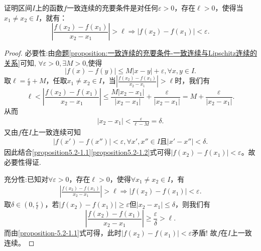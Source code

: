 \documentclass[../../main.tex]{subfiles}%
\begin{document}
\begin{proposition}\label{proposition:一致连续的充要条件-分式形式}
证明区间\(I\)上的函数\(f\)一致连续的充要条件是对任何\(\varepsilon > 0\)，存在\(\ell > 0\)，使得当\(x_1\neq x_2\in I\)，就有：
\[
\left|\frac{f(x_2)-f(x_1)}{x_2 - x_1}\right|>\ell\Rightarrow|f(x_2)-f(x_1)|<\varepsilon.
\]
\end{proposition}
\begin{proof}

{\heiti 必要性:}由\hyperref[proposition:一致连续的充要条件-一致连续与Lipschitz连续的关系]{命题\ref{proposition:一致连续的充要条件-一致连续与Lipschitz连续的关系}}可知,
$\forall \varepsilon>0,\exists M > 0$,使得
\[
|f(x)-f(y)|\leqslant  M|x - y|+\varepsilon,\forall x,y\in I.
\]
取\(\ell=\frac{\varepsilon}{\delta}+M\)，任取\(x_1\neq x_2\in I\)，当\(\left|\frac{f(x_2)-f(x_1)}{x_2 - x_1}\right|>\ell\)时，我们有
\[
\ell<\left|\frac{f(x_2)-f(x_1)}{x_2 - x_1}\right|\leqslant \frac{M|x_2 - x_1|}{|x_2 - x_1|}+\frac{\varepsilon}{|x_2 - x_1|}=M+\frac{\varepsilon}{|x_2 - x_1|}.
\]
从而
\begin{align}
|x_2 - x_1|<\frac{\varepsilon}{\ell - M}=\delta.  \label{proposition5.2-1.1}
\end{align}
又由\(f\)在\(I\)上一致连续可知
\begin{align}
|f(x') - f(x'')|<\varepsilon,\forall x',x''\in I\text{且}|x' - x''|<\delta. \label{proposition5.2-1.2} 
\end{align}
因此结合\eqref{proposition5.2-1.1}\eqref{proposition5.2-1.2}式可得\(|f(x_2)-f(x_1)|<\varepsilon\)。故必要性得证.

{\heiti 充分性:}已知对\(\forall \varepsilon >0\)，存在\(\ell >0\)，使得\(\forall x_1\neq x_2\in I\)，有
\begin{align}
\left|\frac{f(x_2) - f(x_1)}{x_2 - x_1}\right|>\ell\Rightarrow|f(x_2) - f(x_1)|<\varepsilon. \label{proposition-5.2-1.1}
\end{align}
取\(\delta \in \left(0,\frac{\varepsilon}{\ell}\right)\)，若\(|f(x_2) - f(x_1)|\geqslant \varepsilon\)但\(|x_2 - x_1|\leqslant \delta\)，则我们有
\[
\left|\frac{f(x_2) - f(x_1)}{x_2 - x_1}\right|\geqslant \frac{\varepsilon}{\delta}>\ell.
\]
而由\eqref{proposition-5.2-1.1}式可得，此时\(|f(x_2) - f(x_1)|<\varepsilon\)矛盾! 故\(f\)在\(I\)上一致连续。 
\end{proof}
\end{document}
